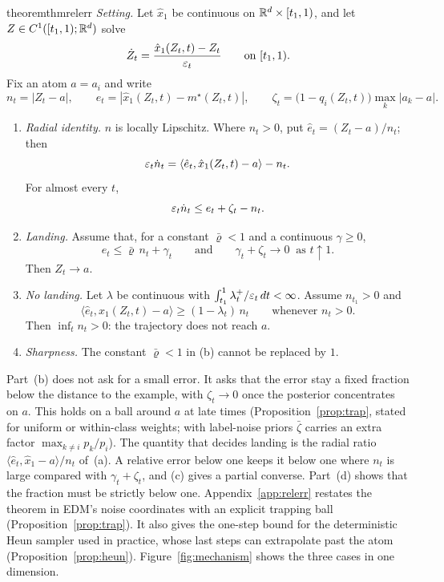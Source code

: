 \documentclass{article} %
\theoremstyle{plain}
\theoremstyle{definition}
\theoremstyle{remark}
\begin{document}
\begin{restatable}{theorem}{thmrelerr}
\label{thm:relerr}
\emph{Setting.} Let $\hat x_1$ be continuous on $\mathbb{R}^d\times[t_1,1)$, and let $Z\in C^1([t_1,1);\mathbb{R}^d)$
solve
\[
\dot Z_t=\frac{\hat x_1(Z_t,t)-Z_t}{\varepsilon_t}\qquad\text{on }[t_1,1).
\]
Fix an atom $a=a_i$ and write
\begin{equation}
n_t=|Z_t-a|,\qquad e_t=|\hat x_1(Z_t,t)-m^\star(Z_t,t)|,\qquad
\zeta_t=\bigl(1-q_i(Z_t,t)\bigr)\max_k|a_k-a| .
\label{eq:relerr-quantities}
\end{equation}
\begin{enumerate}[label=(\alph*),leftmargin=2em]
\item \emph{Radial identity.} $n$ is locally Lipschitz. Where $n_t>0$, put $\hat e_t=(Z_t-a)/n_t$;
  then
  \[
  \varepsilon_t\dot n_t=\langle\hat e_t,\hat x_1(Z_t,t)-a\rangle-n_t .
  \]
  For almost every $t$,
  \[
  \varepsilon_t\dot n_t\le e_t+\zeta_t-n_t .
  \]
\item \emph{Landing.} Assume that, for a constant $\bar\varrho<1$ and a continuous $\gamma\ge0$,
  \[
  e_t\le\bar\varrho\,n_t+\gamma_t\qquad\text{and}\qquad\gamma_t+\zeta_t\to0\ \text{ as }t\uparrow1 .
  \]
  Then $Z_t\to a$.
\item \emph{No landing.} Let $\lambda$ be continuous with $\int_{t_1}^1\lambda_t^+/\varepsilon_t\,dt<\infty$.
  Assume $n_{t_1}>0$ and
  \[
  \langle\hat e_t,\hat x_1(Z_t,t)-a\rangle\ge(1-\lambda_t)\,n_t\qquad\text{whenever }n_t>0 .
  \]
  Then $\inf_tn_t>0$: the trajectory does not reach $a$.
\item \emph{Sharpness.} The constant $\bar\varrho<1$ in (b) cannot be replaced by $1$.
\end{enumerate}
\end{restatable}

Part~(b) does not ask for a small error. It asks that the error stay a fixed
fraction below the distance to the example, with $\zeta_t\to0$ once the posterior concentrates on
$a$. This holds on a ball around $a$ at late times (Proposition~\ref{prop:trap}, stated for
uniform or within-class weights; with label-noise priors $\bar\zeta$ carries an extra factor
$\max_{k\ne i}p_k/p_i$). The quantity that decides landing is the radial ratio
$\langle\hat e_t,\hat x_1-a\rangle/n_t$ of~(a). A relative error below one keeps it below one where
$n_t$ is large compared with $\gamma_t+\zeta_t$, and (c) gives a partial converse. Part~(d) shows
that the fraction must be strictly below one.
Appendix~\ref{app:relerr} restates the theorem in EDM's noise coordinates with an explicit trapping
ball (Proposition~\ref{prop:trap}). It also gives the one-step bound for the deterministic Heun
sampler used in practice, whose last steps can extrapolate past the atom
(Proposition~\ref{prop:heun}). Figure~\ref{fig:mechanism} shows the three cases in one dimension.
\end{document}

